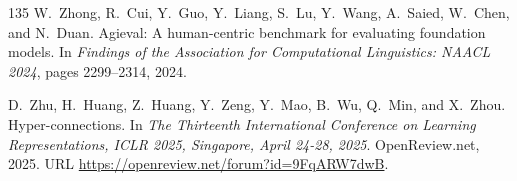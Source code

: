 \begin{thebibliography}{135}
W.~Zhong, R.~Cui, Y.~Guo, Y.~Liang, S.~Lu, Y.~Wang, A.~Saied, W.~Chen, and
  N.~Duan.
\newblock Agieval: A human-centric benchmark for evaluating foundation models.
\newblock In \emph{Findings of the Association for Computational Linguistics:
  NAACL 2024}, pages 2299--2314, 2024.

D.~Zhu, H.~Huang, Z.~Huang, Y.~Zeng, Y.~Mao, B.~Wu, Q.~Min, and X.~Zhou.
\newblock Hyper-connections.
\newblock In \emph{The Thirteenth International Conference on Learning
  Representations, {ICLR} 2025, Singapore, April 24-28, 2025}. OpenReview.net,
  2025.
\newblock URL \url{https://openreview.net/forum?id=9FqARW7dwB}.

\end{thebibliography}
